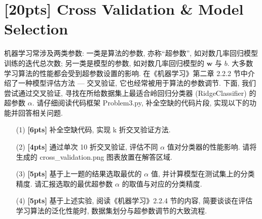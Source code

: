 \documentclass[a4paper,UTF8]{article}
\numberwithin{equation}{section}
\theoremstyle{definition}
\begin{document}
\newpage
\section{[20pts] Cross Validation \& Model Selection}
机器学习常涉及两类参数: 一类是算法的参数, 亦称``超参数'', 如对数几率回归模型训练的迭代总次数; 另一类是模型的参数, 如对数几率回归模型的 $\mathbf{w}$ 与 $b$. 大多数学习算法的性能都会受到超参数设置的影响. 在《机器学习》第二章 2.2.2 节中介绍了一种模型评估方法 --- 交叉验证, 它也经常被用于算法的参数调节. 下面, 我们尝试通过交叉验证, 寻找在所给数据集上最适合岭回归分类器 (RidgeClassifier) 的超参数 $\alpha$. 请仔细阅读代码框架 Problem3.py, 补全空缺的代码片段, 实现以下的功能并回答相关问题.
\begin{enumerate}
    \item [(1)] \textbf{[6pts]} 补全空缺代码, 实现 k 折交叉验证方法.
    \item [(2)] \textbf{[4pts]} 通过单次 10 折交叉验证, 评估不同 $\alpha$ 值对分类器的性能影响. 请将生成的 cross\_validation.png 图表放置在解答区域.
    \item [(3)] \textbf{[5pts]} 基于上一题的结果选取最优的 $\alpha$ 值, 并计算模型在测试集上的分类精度. 请汇报选取的最优超参数 $\alpha$ 的取值与对应的分类精度.
    \item [(4)] \textbf{[5pts]} 基于上述实验, 阅读《机器学习》2.2.4 节的内容, 简要谈谈在评估学习算法的泛化性能时, 数据集划分与超参数调节的大致流程.
\end{enumerate}
\end{document}
